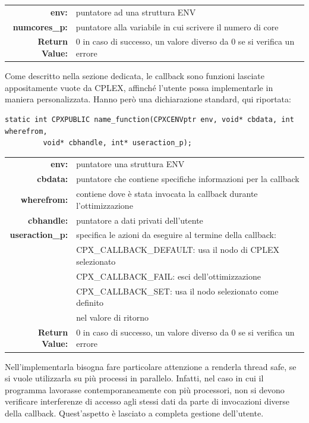 \begin{table}[h]
\centering
\begin{tabular}{rl}
\textbf{env:} & {puntatore ad una struttura ENV}\\
\textbf{numcores\_p:} & {puntatore alla variabile in cui scrivere il numero di core}\\ 
\textbf{Return Value:} & {0 in caso di successo, un valore diverso da 0 se si verifica un errore}\\           
\end{tabular}
\end{table} 
Come descritto nella sezione dedicata, le callback sono funzioni lasciate appositamente vuote da CPLEX, affinché l'utente possa implementarle in maniera personalizzata. Hanno però una dichiarazione standard, qui riportata: 
\begin{center}
\begin{lstlisting}[linewidth=400pt, basicstyle=\footnotesize\sffamily,]     
static int CPXPUBLIC name_function(CPXCENVptr env, void* cbdata, int wherefrom,
		 void* cbhandle, int* useraction_p);
\end{lstlisting}
\end{center}
\begin{table}[h]
\centering
\begin{tabular}{rl}
\textbf{env:} & {puntatore una struttura ENV}\\
\textbf{cbdata:} & {puntatore che contiene specifiche informazioni per la callback}\\
\textbf{wherefrom:} & {contiene dove è stata invocata la callback durante l'ottimizzazione} \\ 
\textbf{cbhandle:} & {puntatore a dati privati dell'utente} \\
\textbf{useraction\_p:} & {specifica le azioni da eseguire al termine della callback:}\\
& {CPX\_CALLBACK\_DEFAULT: usa il nodo di CPLEX selezionato}\\
& {CPX\_CALLBACK\_FAIL: esci dell'ottimizzazione}\\
& {CPX\_CALLBACK\_SET: usa il nodo selezionato come definito}\\  
& {nel valore di ritorno}\\ 
\textbf{Return Value:} & {0 in caso di successo, un valore diverso da 0 se si verifica un errore}\\                      
\end{tabular}
\end{table} 
Nell'implementarla bisogna fare particolare attenzione a renderla thread safe, se si vuole utilizzarla su più processi in parallelo. Infatti, nel caso in cui il programma lavorasse contemporaneamente con più processori, non si devono verificare interferenze di accesso agli stessi dati da parte di invocazioni diverse della callback. Quest'aspetto è lasciato a completa gestione dell'utente.\\
